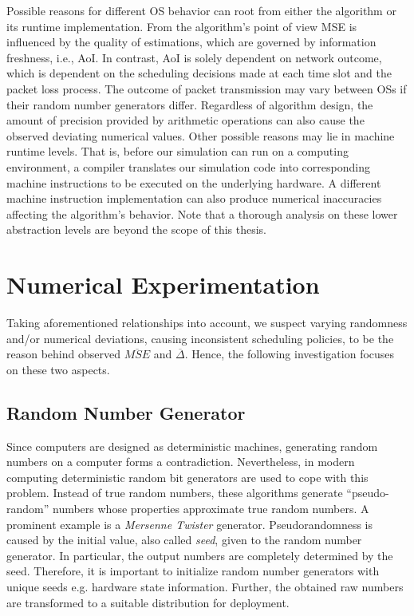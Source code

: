 Possible reasons for different OS behavior can root from either the algorithm or
its runtime implementation. From the algorithm's point of view MSE is influenced
by the quality of estimations, which are governed by information freshness,
i.e., AoI. In contrast, AoI is solely dependent on network outcome, which is
dependent on the scheduling decisions made at each time slot and the packet loss
process. The outcome of packet transmission may vary between OSs if their random
number generators differ. Regardless of algorithm design, the amount of
precision provided by arithmetic operations can also cause the observed
deviating numerical values. Other possible reasons may lie in machine runtime
levels. That is, before our simulation can run on a computing environment, a
compiler translates our simulation code into corresponding machine instructions
to be executed on the underlying hardware. A different machine instruction
implementation can also produce numerical inaccuracies affecting the algorithm's
behavior. Note that a thorough analysis on these lower abstraction levels are
beyond the scope of this thesis.


\section{Numerical Experimentation} \label{sec:experiments}

Taking aforementioned relationships into account, we suspect varying randomness
and/or numerical deviations, causing inconsistent scheduling policies, to be the
reason behind observed $\overline{MSE}$ and $\overline{\Delta}$. Hence, the
following investigation focuses on these two aspects.

\subsection{Random Number Generator}

Since computers are designed as deterministic machines, generating random
numbers on a computer forms a contradiction. Nevertheless, in modern computing
deterministic random bit generators are used to cope with this problem. Instead
of true random numbers, these algorithms generate ``pseudo-random'' numbers
whose properties approximate true random numbers. A prominent example is a
\textit{Mersenne Twister} generator. Pseudorandomness is caused by the initial
value, also called \textit{seed}, given to the random number generator. In
particular, the output numbers are completely determined by the seed. Therefore,
it is important to initialize random number generators with unique seeds e.g.
hardware state information. Further, the obtained raw numbers are transformed to
a suitable distribution for deployment.

